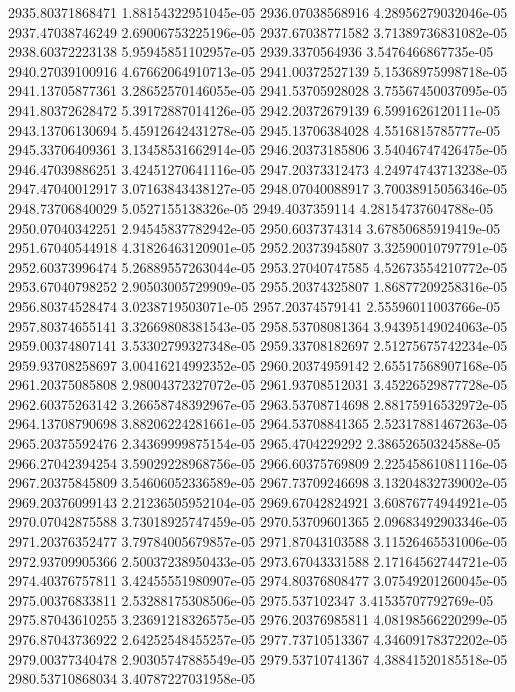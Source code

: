 {2935.80371868471 1.88154322951045e-05
2936.07038568916 4.28956279032046e-05
2937.47038746249 2.69006753225196e-05
2937.67038771582 3.71389736831082e-05
2938.60372223138 5.95945851102957e-05
2939.3370564936 3.5476466867735e-05
2940.27039100916 4.67662064910713e-05
2941.00372527139 5.15368975998718e-05
2941.13705877361 3.28652570146055e-05
2941.53705928028 3.75567450037095e-05
2941.80372628472 5.39172887014126e-05
2942.20372679139 6.5991626120111e-05
2943.13706130694 5.45912642431278e-05
2945.13706384028 4.5516815785777e-05
2945.33706409361 3.13458531662914e-05
2946.20373185806 3.54046747426475e-05
2946.47039886251 3.42451270641116e-05
2947.20373312473 4.24974743713238e-05
2947.47040012917 3.07163843438127e-05
2948.07040088917 3.70038915056346e-05
2948.73706840029 5.0527155138326e-05
2949.4037359114 4.28154737604788e-05
2950.07040342251 2.94545837782942e-05
2950.6037374314 3.67850685919419e-05
2951.67040544918 4.31826463120901e-05
2952.20373945807 3.32590010797791e-05
2952.60373996474 5.26889557263044e-05
2953.27040747585 4.52673554210772e-05
2953.67040798252 2.90503005729909e-05
2955.20374325807 1.86877209258316e-05
2956.80374528474 3.0238719503071e-05
2957.20374579141 2.55596011003766e-05
2957.80374655141 3.32669808381543e-05
2958.53708081364 3.94395149024063e-05
2959.00374807141 3.53302799327348e-05
2959.33708182697 2.51275675742234e-05
2959.93708258697 3.00416214992352e-05
2960.20374959142 2.65517568907168e-05
2961.20375085808 2.98004372327072e-05
2961.93708512031 3.45226529877728e-05
2962.60375263142 3.26658748392967e-05
2963.53708714698 2.88175916532972e-05
2964.13708790698 3.88206224281661e-05
2964.53708841365 2.52317881467263e-05
2965.20375592476 2.34369999875154e-05
2965.4704229292 2.38652650324588e-05
2966.27042394254 3.59029228968756e-05
2966.60375769809 2.22545861081116e-05
2967.20375845809 3.54606052336589e-05
2967.73709246698 3.13204832739002e-05
2969.20376099143 2.21236505952104e-05
2969.67042824921 3.60876774944921e-05
2970.07042875588 3.73018925747459e-05
2970.53709601365 2.09683492903346e-05
2971.20376352477 3.79784005679857e-05
2971.87043103588 3.11526465531006e-05
2972.93709905366 2.50037238950433e-05
2973.67043331588 2.17164562744721e-05
2974.40376757811 3.42455551980907e-05
2974.80376808477 3.07549201260045e-05
2975.00376833811 2.53288175308506e-05
2975.537102347 3.41535707792769e-05
2975.87043610255 3.23691218326575e-05
2976.20376985811 4.08198566220299e-05
2976.87043736922 2.64252548455257e-05
2977.73710513367 4.34609178372202e-05
2979.00377340478 2.90305747885549e-05
2979.53710741367 4.38841520185518e-05
2980.53710868034 3.40787227031958e-05
}
